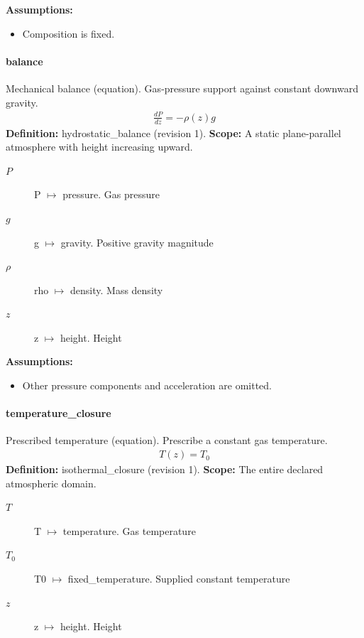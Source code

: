 \noindent\textbf{Assumptions:}
\begin{itemize}
\item Composition is fixed.
\end{itemize}

\paragraph{balance}
Mechanical balance (equation). Gas-pressure support against constant downward gravity.
\begin{equation}
\begin{aligned}
\frac{dP}{dz}=-\rho(z)g
\end{aligned}
\label{eq:example.isothermal_5f_atmosphere_3a_atmosphere:balance:1}
\end{equation}
\noindent\textbf{Definition:} hydrostatic\_balance (revision 1).
\textbf{Scope:} A static plane-parallel atmosphere with height increasing upward.

\begin{description}
\item[$P$] P $\mapsto$ pressure. Gas pressure
\item[$g$] g $\mapsto$ gravity. Positive gravity magnitude
\item[$\rho$] rho $\mapsto$ density. Mass density
\item[$z$] z $\mapsto$ height. Height
\end{description}

\noindent\textbf{Assumptions:}
\begin{itemize}
\item Other pressure components and acceleration are omitted.
\end{itemize}

\paragraph{temperature\_closure}
Prescribed temperature (equation). Prescribe a constant gas temperature.
\begin{equation}
\begin{aligned}
T(z)=T_0
\end{aligned}
\label{eq:example.isothermal_5f_atmosphere_3a_atmosphere:temperature_5f_closure:1}
\end{equation}
\noindent\textbf{Definition:} isothermal\_closure (revision 1).
\textbf{Scope:} The entire declared atmospheric domain.

\begin{description}
\item[$T$] T $\mapsto$ temperature. Gas temperature
\item[$T_0$] T0 $\mapsto$ fixed\_temperature. Supplied constant temperature
\item[$z$] z $\mapsto$ height. Height
\end{description}

